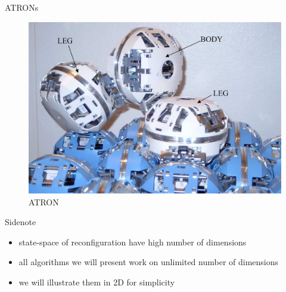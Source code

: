\documentclass[ignorenonframetext,aspectratio=169,]{paradise-slide}
\providecommand{\tightlist}{%
  \setlength{\itemsep}{0pt}\setlength{\parskip}{0pt}}
\begin{document}
\begin{frame}[fragile]{ATRONs}
\protect\hypertarget{atrons}{}

\begin{figure}
\centering
\includegraphics{atron.jpg}
\caption{ATRON}
\end{figure}

\end{frame}

\begin{frame}[fragile]{Sidenote}
\protect\hypertarget{sidenote}{}

\begin{itemize}
\tightlist
\item
  state-space of reconfiguration have high number of dimensions
\item
  all algorithms we will present work on unlimited number of dimensions
\item
  we will illustrate them in 2D for simplicity
\end{itemize}

\end{frame}
\end{document}
